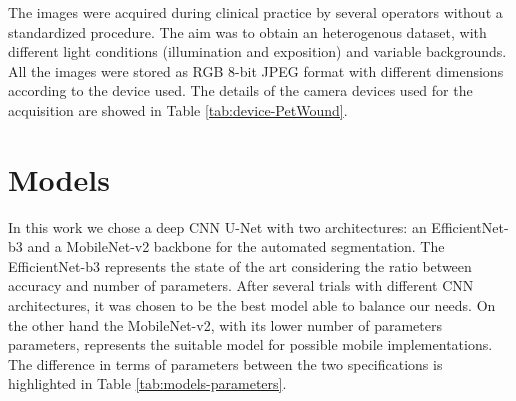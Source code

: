 \documentclass[../main.tex]{subfiles}
\begin{document}
The images were acquired during clinical practice by several operators without a standardized procedure. 
The aim was to obtain an heterogenous dataset, with different light conditions (illumination and exposition) and variable backgrounds.
All the images were stored as RGB 8-bit JPEG format with different dimensions according to the device used. The details of the camera devices used for the acquisition are showed in Table \ref{tab:device-PetWound}.

\begin{table}[!ht]
    \centering
    \caption{. Main specifics of the camera devices used for the acquisition of the photos. The Petwound database is composed by images acquired with three different camera devices. In details, there are three different smartphone digital cameras and an Olympus digital camera.}
    \label{tab:device-PetWound}
\end{table}

\section{Models}

In this work we chose a deep CNN U-Net with two architectures: an EfficientNet-b3 \cite{tan2019efficientnet} and a MobileNet-v2 \cite{sandler2018mobilenetv2} backbone for the automated segmentation.
The EfficientNet-b3 represents the state of the art considering the ratio between accuracy and number of parameters. 
After several trials  with different CNN architectures, it was chosen to be the best model able to balance our needs.
On the other hand the MobileNet-v2, with its lower number of parameters parameters, represents the suitable model for possible mobile implementations. 
The difference in terms of parameters between the two specifications is highlighted in Table \ref{tab:models-parameters}.
\end{document}
